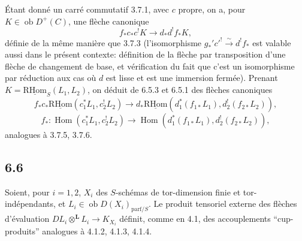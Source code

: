 \documentclass[11pt]{article}
\DeclareMathOperator{\Hom}{Hom}
\providecommand{\RHom}{\mathrm{RHom}}
\providecommand{\uRHom}{\underline{\RHom}}
\providecommand{\RHom}{\mathrm{RHom}}
\providecommand{\Hom}{\operatorname{Hom}}
\providecommand{\RHom}{\mathrm R\mathcal{H}om}
\providecommand{\RHom}{\mathrm{RHom}}
\providecommand{\Hom}{\operatorname{Hom}}
\begin{document}
Étant donné un carré commutatif 3.7.1, avec $c$ propre, on a, pour $K\in\operatorname{ob}D^+(C)$, une flèche canonique
\begin{equation}
\tag{6.5.3}
f_*c_*c^!K\longrightarrow d_*d^!f_*K,
\end{equation}
définie de la même manière que 3.7.3 (l'isomorphisme $g_*'c'^!\xrightarrow{\sim}d^!f_*$ est valable aussi dans le présent contexte: définition de la flèche par transposition d'une flèche de changement de base, et vérification du fait que c'est un isomorphisme par réduction aux cas où $d$ est lisse et est une immersion fermée). Prenant $K=\uRHom_S(L_1,L_2)$, on déduit de 6.5.3 et 6.5.1 des flèches canoniques
\begin{equation}
\tag{6.5.4}
f_*c_*\uRHom(c_1^*L_1,c_2^!L_2)\longrightarrow d_*\uRHom(d_1^*(f_{1*}L_1),d_2^!(f_{2*}L_2)),
\end{equation}
\begin{equation}
\tag{6.5.5}
f_*:\Hom(c_1^*L_1,c_2^!L_2)\longrightarrow\Hom(d_1^*(f_{1*}L_1),d_2^!(f_{2*}L_2)),
\end{equation}
analogues à 3.7.5, 3.7.6.

\subsection*{6.6}
Soient, pour $i=1,2$, $X_i$ des $S$-schémas de tor-dimension finie et tor-indépendants, et $L_i\in\operatorname{ob}D(X_i)_{\mathrm{parf}/S}$. Le produit tensoriel externe des flèches d'évaluation $DL_i\otimes^{\mathbf L}L_i\to K_{X_i}$ définit, comme en 4.1, des accouplements ``cup-produits'' analogues à 4.1.2, 4.1.3, 4.1.4.
\end{document}
